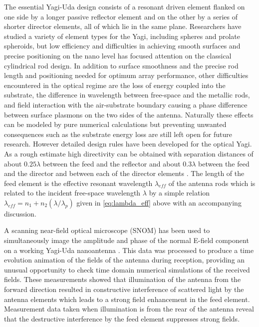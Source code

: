 \documentclass[11pt]{article}
\begin{document}
The essential Yagi-Uda design consists of a resonant driven element flanked on one side by a longer passive reflector element and on the other by a series of shorter director elements, all of which lie in the same plane. Researchers have studied a variety of element types for the Yagi, including spheres and prolate spheroids, but low efficiency and difficulties in achieving smooth surfaces and precise positioning on the nano level has focused attention on the classical cylindrical rod design. In addition to surface smoothness and the precise rod length and positioning needed for optimum array performance, other difficulties encountered in the optical regime are the loss of energy coupled into the substrate, the difference in wavelength between free-space and the metallic rods, and field interaction with the air-substrate boundary causing a phase difference between surface plasmons on the two sides of the antenna. Naturally these effects can be modeled by pure numerical calculations but preventing unwanted consequences such as the substrate energy loss are still left open for future research. However detailed design rules have been developed
\cite{Hofmann2007} for the optical Yagi. As a rough estimate high directivity can be obtained with separation distances of about $0.25 \lambda$ between the feed and the reflector and about $0.3 \lambda$ between the feed and the director and between each of the director elements \cite{Kosako2010}. The length of the feed element is the effective resonant wavelength $\lambda_{eff}$ of the antenna rods which is related to the incident free-space wavelength $\lambda$ by a simple relation
$\lambda_{eff} = n_1 + n_2(\lambda/\lambda_p )$ given in \eqref{eq:lambda_eff} above with an accompanying discussion.

A scanning near-field optical microscope (SNOM) has been used to simultaneously image the amplitude and phase of the normal E-field component on a working Yagi-Uda nanoantenna \cite{Dorfmuller2011}. This data was processed to produce a time evolution animation of the fields of the antenna during reception, providing an unusual opportunity to check time domain numerical simulations of the received fields. These measurements showed that illumination of the antenna from the forward direction resulted in constructive interference of scattered light by the antenna elements which leads to a strong field enhancement in the feed element. Measurement data taken when illumination is from the rear of the antenna reveal that the destructive interference by the feed element suppresses strong fields.
\end{document}
